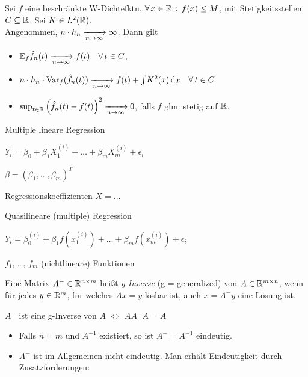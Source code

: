 \documentclass{cheat-sheet}
\newcommand{\E}{\mathbb{E}} %
\DeclareMathOperator{\var}{Var} %
\begin{document}
\begin{satz}
  Sei $f$ eine beschränkte W-Dichtefktn, $\forall \, {x \in \mathbb{R}} \,:\, f(x) \leq M$, mit Stetigkeitsstellen $C \subseteq \mathbb{R}$.
  Sei $K \in L^2(\mathbb{R})$. \\
  Angenommen, $n \cdot h_n \xrightarrow[n \to \infty]{} \infty$.
  Dann gilt
  \begin{itemize}
    \item $\E_f \hat{f}_n(t) \xra[n \to \infty]{} f(t) \quad \forall \, t \in C$,
    \item $n \cdot h_n \cdot \var_f (\hat{f}_n(t)) \xra[n \to \infty]{} f(t) + \IInt{K^2(x)}{x} \quad \forall \, t \in C$
    \item $\sup_{t \in \mathbb{R}} \left( \hat{f}_n(t) - f(t) \right)^2 \xrightarrow[n \to \infty]{} 0$, falls $f$ glm. stetig auf $\mathbb{R}$.
  \end{itemize}
\end{satz}

\fi


Multiple lineare Regression

$Y_i = \beta_0 + \beta_1 X_1^{(i)} + \ldots + \beta_m X_m^{(i)} + \epsilon_i$

$\beta = (\beta_1, \ldots, \beta_m)^T$

Regressionskoeffizienten $X = ...$

Quasilineare (multiple) Regression

$Y_i = \beta_0^{(i)} + \beta_1 f(x_1^{(i)}) + \ldots + \beta_m f(x_m^{(i)}) + \epsilon_i$

$f_1$, \ldots, $f_m$ (nichtlineare) Funktionen

\begin{defn}
  Eine Matrix $A^{-} \in \mathbb{R}^{n \times m}$ heißt \emph{g-Inverse} (g = generalized) von $A \in \mathbb{R}^{m \times n}$, wenn für jedes $y \in \mathbb{R}^m$, für welches $Ax = y$ lösbar ist, auch $x = A^{-} y$ eine Lösung ist.
\end{defn}

\begin{satz}
  $A^{-}$ ist eine g-Inverse von $A$ $\iff$ $A A^{-} A = A$
\end{satz}

\begin{bem}
  \begin{itemize}
    \item Falls $n = m$ und $A^{-1}$ existiert, so ist $A^{-} = A^{-1}$ eindeutig.
    \item $A^{-}$ ist im Allgemeinen nicht eindeutig.
    Man erhält Eindeutigkeit durch Zusatzforderungen:
  \end{itemize}
\end{bem}
\end{document}
